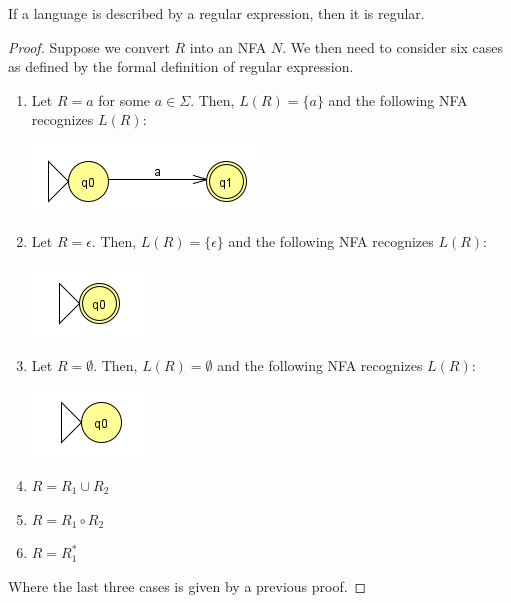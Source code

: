 \documentclass[letterpaper]{article}
\begin{document}
\begin{lemma}{}{}
    If a language is described by a regular expression, then it is regular. 
\end{lemma}

\begin{mdframed}[]
    \begin{proof}
        Suppose we convert $R$ into an NFA $N$. We then need to consider six cases as defined by the formal definition of regular expression.
        \begin{enumerate}
            \item Let $R = a$ for some $a \in \Sigma$. Then, $L(R) = \{a\}$ and the following NFA recognizes $L(R)$:
            \begin{center}
                \includegraphics[scale=0.75]{assets/nfa_regex_pf_1.png}
            \end{center}
            
            \item Let $R = \epsilon$. Then, $L(R) = \{\epsilon\}$ and the following NFA recognizes $L(R)$:
            \begin{center}
                \includegraphics[scale=0.75]{assets/nfa_regex_pf_2.png}
            \end{center}

            \item Let $R = \emptyset$. Then, $L(R) = \emptyset$ and the following NFA recognizes $L(R)$:
            \begin{center}
                \includegraphics[scale=0.75]{assets/nfa_regex_pf_3.png}
            \end{center}

            \item $R = R_1 \cup R_2$
            \item $R = R_1 \circ R_2$
            \item $R = R_{1}^*$
        \end{enumerate}
        Where the last three cases is given by a previous proof. 
    \end{proof}
\end{mdframed}
\end{document}
